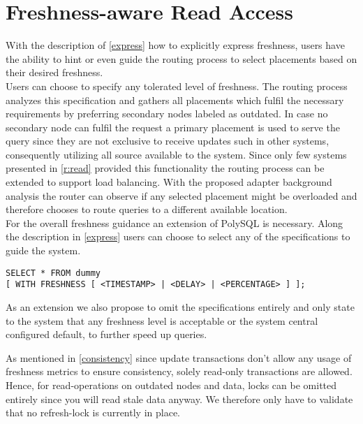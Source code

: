 \section{Freshness-aware Read Access}


With the description of \ref{express} how to explicitly express freshness, users have the ability to hint or even guide the routing process to select placements 
based on their desired freshness.\\
Users can choose to specify any tolerated level of freshness. The routing process analyzes this specification and gathers all placements which fulfil the necessary 
requirements by preferring secondary nodes labeled as outdated.
In case no secondary node can fulfil the request a primary placement is used to serve the query since they are not exclusive to receive updates such in other systems,
consequently utilizing all source available to the system.
Since only few systems presented in \ref{r:read} provided this functionality the routing process can be extended to support load balancing. 
With the proposed adapter background analysis the router can observe if any selected placement might be overloaded and therefore chooses to route 
queries to a different available location. \\



For the overall freshness guidance an extension of PolySQL is necessary.
Along the description in \ref{express} users can choose to select any of the specifications to guide the system.
\begin{verbatim}
SELECT * FROM dummy 
[ WITH FRESHNESS [ <TIMESTAMP> | <DELAY> | <PERCENTAGE> ] ];
\end{verbatim}
As an extension we also propose to omit the specifications entirely and only state to the system that any freshness level is acceptable or the system central
configured default, to further speed up queries.



As mentioned in \ref{consistency} since update transactions don't allow any usage of freshness metrics to ensure consistency, solely read-only transactions are allowed.
Hence, for read-operations on outdated nodes and data, locks can be omitted entirely since you will read stale data anyway.
We therefore only have to validate that no refresh-lock is currently in place.




